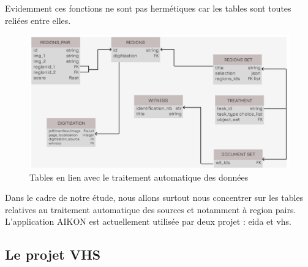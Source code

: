 Evidemment ces fonctions ne sont pas hermétiques car les tables sont toutes reliées entre elles. 

\begin{figure}[H]
	\centering
	\includegraphics[width=1\textwidth]{images/tables_traitement_donnees.png}
	\caption{Tables en lien avec le traitement automatique des données}
	\label{fig:tables_traitement}
\end{figure}


Dans le cadre de notre étude, nous allons surtout nous concentrer sur les tables relatives au traitement automatique des sources et notamment à region pairs. \\

L'application AIKON est actuellement utilisée par deux projet : \gls{eida} et \gls{vhs}.


\subsection{Le projet VHS}

